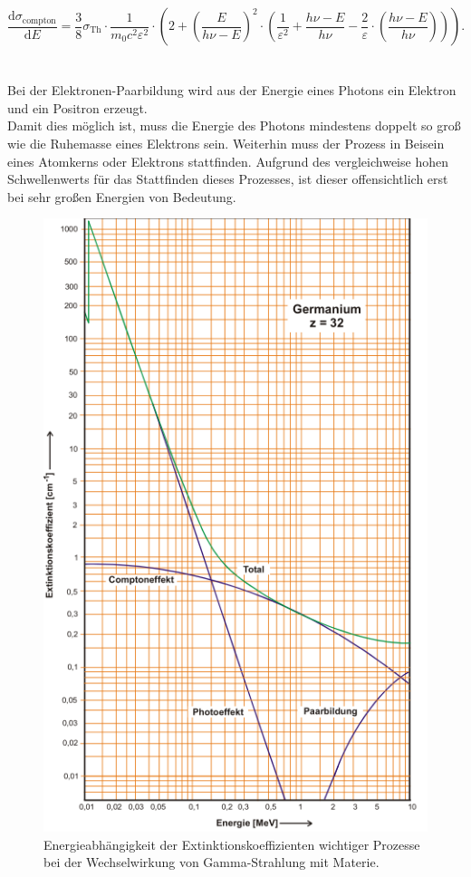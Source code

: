 \begin{equation}
  \label{eqn:dsig}
  \frac{\mathrm{d}\sigma_\text{compton}}{\mathrm{d}E} = \frac{3}{8} \sigma_\text{Th}
  \cdot \frac{1}{m_{0} c^2 \varepsilon^2} \cdot \left(  2 + \left( \frac{E}{h\nu - E} \right)^2
  \cdot \left( \frac{1}{\varepsilon^2} + \frac{h\nu - E}{h\nu} - \frac{2}{\varepsilon}
  \cdot \left( \frac{h\nu - E}{h\nu} \right) \right) \right) .
\end{equation}
\\ \\
Bei der Elektronen-Paarbildung wird aus der Energie eines Photons ein Elektron und ein Positron erzeugt.\\
Damit dies möglich ist, muss die Energie des Photons mindestens doppelt so groß wie die Ruhemasse eines Elektrons
sein. Weiterhin muss der Prozess in Beisein eines Atomkerns oder Elektrons stattfinden. Aufgrund des vergleichweise
hohen Schwellenwerts für das Stattfinden dieses Prozesses, ist dieser offensichtlich erst bei sehr großen Energien
von Bedeutung.

\FloatBarrier
\begin{figure}
  \includegraphics[width=\textwidth]{content/skizzen/extinktion.PNG}
  \caption{Energieabhängigkeit der Extinktionskoeffizienten wichtiger Prozesse bei der Wechselwirkung von Gamma-Strahlung mit Materie.}
  \label{fig:extinktion}
\end{figure}
\FloatBarrier

